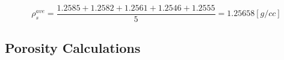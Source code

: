 \documentclass[a4paper,fleqn]{cas-dc}
\begin{document}
{\footnotesize
	\begin{equation*}
		\rho_s^{ave} = \frac{1.2585+1.2582+1.2561+1.2546+1.2555}{5} = 1.25658 [g/cc]
	\end{equation*}
}

\subsection{Porosity Calculations} \label{CH: Porosity}


%

%
\end{document}
